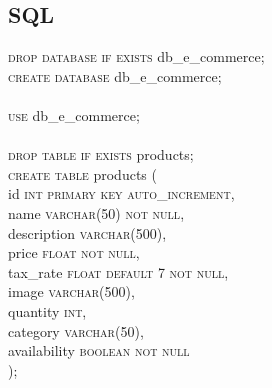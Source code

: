 \documentclass{article}
\begin{document}

\subsection{SQL}
\textsc{\textcolor{sentence}{drop database if exists}} db\_e\_commerce;\\
\textsc{\textcolor{sentence}{create database}} db\_e\_commerce;\\\\
\textsc{\textcolor{sentence}{use}} db\_e\_commerce;\\\\
\textsc{\textcolor{sentence}{drop table if exists}} products;\\
\textsc{\textcolor{sentence}{create table}} products (\\
\phantom{abc} id \textsc{\textcolor{sentence}{int primary key auto\_increment}},\\
\phantom{abc} name \textsc{\textcolor{sentence}{varchar\textcolor{numberSQL}{(50)} not null}},\\
\phantom{abc} description \textsc{\textcolor{sentence}{varchar\textcolor{numberSQL}{(500)}}},\\
\phantom{abc} price \textsc{\textcolor{sentence}{float not null}},\\
 \phantom{abc} tax\_rate \textsc{\textcolor{sentence}{float default \textcolor{numberSQL}{7} not null}},\\
\phantom{abc} image \textsc{\textcolor{sentence}{varchar\textcolor{numberSQL}{(500)}}},\\
\phantom{abc} quantity \textsc{\textcolor{sentence}{int}},\\
\phantom{abc} category \textsc{\textcolor{sentence}{varchar\textcolor{numberSQL}{(50)}}},\\
 \phantom{abc} availability \textsc{\textcolor{sentence}{boolean not null}}\\);\\\\
 
\end{document}
